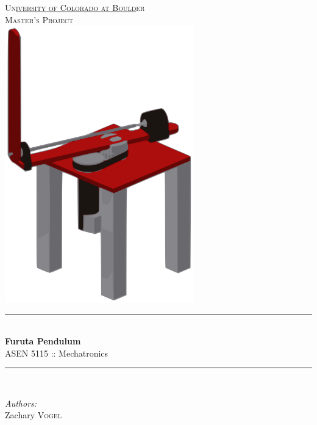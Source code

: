 \documentclass[12pt]{extarticle}
\newcommand{\HRule}{\rule{\linewidth}{0.5mm}}
\begin{document}
	\begin{titlepage}
		\begin{center}
			\textsc{\LARGE Un\underline{iversity of Colorado at Bould}er}\\[0.5cm]
			\textsc{\Large Master's Project}\\[1.5cm]
			\includegraphics[height=12cm]{Title/Cover.png}\\[.5cm]
			\HRule \\[0.4cm]
			{ \LARGE \bfseries Furuta Pendulum\\[0.2cm]}\small ASEN 5115 :: Mechatronics\\[0.4cm]
			\HRule \\[1cm]
				\begin{minipage}{0.4\textwidth}
					\begin{flushleft} \large
						\hspace*{-1em}\emph{Authors:}\\
						Zachary \textsc{Vogel}\\
					\end{flushleft}
				\end{minipage}
				\begin{minipage}{0.4\textwidth}
					\begin{flushright} \large
						\hspace{-2em}\emph{ } \\

\end{flushright}
\end{minipage}
\end{center}
\end{titlepage}
\end{document}

